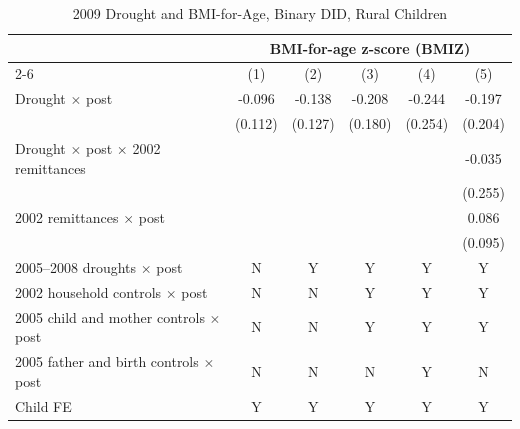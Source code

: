 \documentclass[12pt]{article}
\begin{document}
\begin{longtable}{l*{5}{c}}
\caption{2009 Drought and BMI-for-Age, Binary DID, Rural Children}\\
\toprule
 & \multicolumn{5}{c}{BMI-for-age z-score (BMIZ)}\\
\cmidrule(lr){2-6}
            &\multicolumn{1}{c}{(1)}         &\multicolumn{1}{c}{(2)}         &\multicolumn{1}{c}{(3)}         &\multicolumn{1}{c}{(4)}         &\multicolumn{1}{c}{(5)}         \\
\midrule
Drought \ensuremath{\times} post&      -0.096         &      -0.138         &      -0.208         &      -0.244         &      -0.197         \\
            &     (0.112)         &     (0.127)         &     (0.180)         &     (0.254)         &     (0.204)         \\
Drought \ensuremath{\times} post \ensuremath{\times} 2002 remittances&                     &                     &                     &                     &      -0.035         \\
            &                     &                     &                     &                     &     (0.255)         \\
2002 remittances \ensuremath{\times} post&                     &                     &                     &                     &       0.086         \\
            &                     &                     &                     &                     &     (0.095)         \\
\midrule
2005--2008 droughts \ensuremath{\times} post&           N         &           Y         &           Y         &           Y         &           Y         \\
2002 household controls \ensuremath{\times} post&           N         &           N         &           Y         &           Y         &           Y         \\
2005 child and mother controls \ensuremath{\times} post&           N         &           N         &           Y         &           Y         &           Y         \\
2005 father and birth controls \ensuremath{\times} post&           N         &           N         &           N         &           Y         &           N         \\
Child FE    &           Y         &           Y         &           Y         &           Y         &           Y         \\

\end{longtable}
\end{document}

